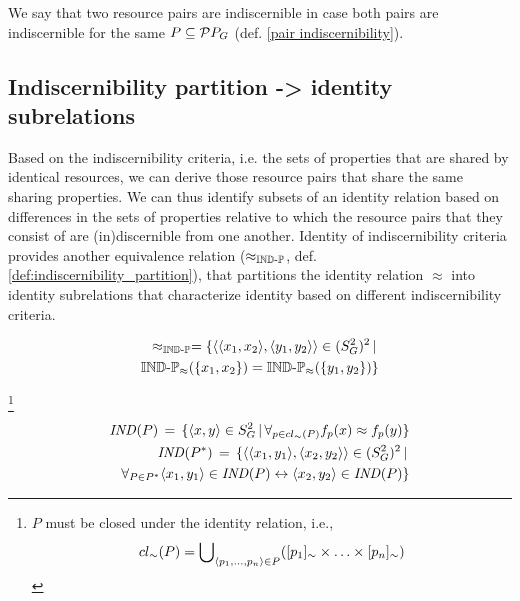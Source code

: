 We say that two resource pairs are indiscernible
  in case both pairs are indiscernible for the same
  $P \subseteq \mathcal{P}{P_G}$
  (def. \ref{pair indiscernibility}).

\subsection{Indiscernibility partition -> identity subrelations}

Based on the indiscernibility criteria,
  i.e. the sets of properties that are shared by identical resources,
  we can derive those resource pairs that share
  the same sharing properties.
We can thus identify subsets of an identity relation based on
  differences in the sets of properties relative to which
  the resource pairs that they consist of are
  (in)discernible from one another.
Identity of indiscernibility criteria provides
  another equivalence relation
  ($\approx_{\operatorname{{\mathbb{IND}-\mathbb{P}}}}$, def. \ref{def:indiscernibility_partition}),
  that partitions the identity relation $\approx$ into
  identity subrelations that characterize identity based on different
  indiscernibility criteria.

\begin{definition}
\label{def:indiscernibility_partition}
\begin{align}
  \approx_{\operatorname{{\mathbb{IND}-\mathbb{P}}}}
=
  \{
    \langle\langle x_1,x_2\rangle,\langle y_1,y_2\rangle\rangle \in (S_G^2)^2
  \,\vert\,\\
    \operatorname{{\mathbb{IND}-\mathbb{P}}}_{\approx}(\{x_1,x_2\}) = \operatorname{{\mathbb{IND}-\mathbb{P}}}_{\approx}(\{y_1,y_2\})
  \}\nonumber
\end{align}
\end{definition}


\footnote{
  $P$ must be closed under the identity relation, i.e.,
  \begin{equation*}
    cl_{\sim}(P) = \bigcup_{\langle p_1,\ldots,p_n\rangle \in P}\nolimits (
      [p_1]_{\sim} \times \ldots \times [p_n]_{\sim}
    )
  \end{equation*}
}

\small
\begin{definition}[Indiscernibility]
\begin{align}
\label{def:resource_indiscernability}
\mathit{IND}(P) \,=\,
  \{
    \langle x,y\rangle \in S_G^2
  \,\vert\,
    \forall_{p \in cl_{\sim}(P)} f_p(x) \approx f_p(y)
  \}
\\
\label{pair indiscernibility}
\mathit{IND}(P^*) \,=\,
  \{
    \langle\langle x_1,y_1\rangle,\langle x_2,y_2\rangle\rangle \in (S_G^2)^2
  \,\vert\,\\
    \forall_{P \in P^*}
        \langle x_1,y_1\rangle \in \mathit{IND}(P)
      \leftrightarrow 
        \langle x_2,y_2\rangle \in \mathit{IND}(P)
  \}\nonumber
\end{align}
\end{definition}
\normalsize

